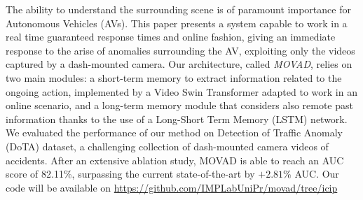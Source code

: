 The ability to understand the surrounding scene is of paramount importance for Autonomous Vehicles (AVs).
This paper presents a system capable to work in a real time guaranteed response times and online fashion, giving an immediate response to the arise of anomalies surrounding the AV, exploiting only the videos captured by a dash-mounted camera.
Our architecture, called \emph{MOVAD}, relies on two main modules: a short-term memory to extract information related to the ongoing action, implemented by a Video Swin Transformer adapted to work in an online scenario, and a long-term memory module that considers also remote past information thanks to the use of a Long-Short Term Memory (LSTM) network.
We evaluated the performance of our method on Detection of Traffic Anomaly (DoTA) dataset, a challenging collection of dash-mounted camera videos of accidents.
After an extensive ablation study, MOVAD is able to reach an AUC score of 82.11\%, surpassing the current state-of-the-art by $+2.81\%$ AUC.
Our code will be available on {\footnotesize \url{https://github.com/IMPLabUniPr/movad/tree/icip}}